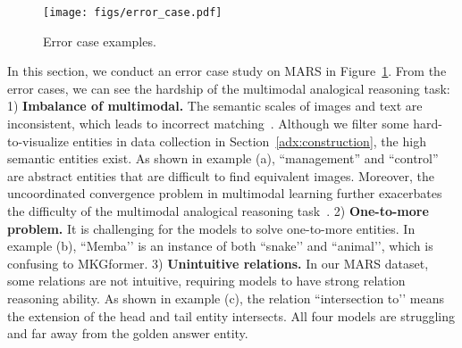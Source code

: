 \documentclass{article} \usepackage{iclr2023_conference,times}
\newcommand{\data}{MARS}
\begin{document}
\begin{figure}[!t]
\centering
\texttt{[image: figs/error\_case.pdf]}
\caption{Error case examples.}
\label{fig:adx_error_case}
\end{figure}

In this section, we conduct an error case study on {\data} in Figure~\ref{fig:adx_error_case}. From the error cases, we can see the hardship of the multimodal analogical reasoning task: 
1) \textbf{Imbalance of multimodal.} The semantic scales of images and text are inconsistent, which leads to incorrect matching~\citep{DBLP:journals/corr/abs-2202-05786}. Although we filter some hard-to-visualize entities in data collection in Section~\ref{adx:construction}, the high semantic entities exist. As shown in example (a), ``management''  and ``control'' are abstract entities that are difficult to find equivalent images. Moreover, the uncoordinated convergence problem in multimodal learning further exacerbates the difficulty of the multimodal analogical reasoning task~\citep{DBLP:journals/corr/abs-2203-15332, DBLP:conf/cvpr/WangTF20}.
2) \textbf{One-to-more problem.} It is challenging for the models to solve one-to-more entities. In example (b), ``Memba’’ is an instance of both ``snake’’ and ``animal’', which is confusing to MKGformer.
3) \textbf{Unintuitive relations.} In our {\data} dataset, some relations are not intuitive, requiring models to have strong relation reasoning ability. As shown in example (c), the relation ``intersection to’’  means the extension of the head and tail entity intersects. All four models are struggling and far away from the golden answer entity.
\end{document}
